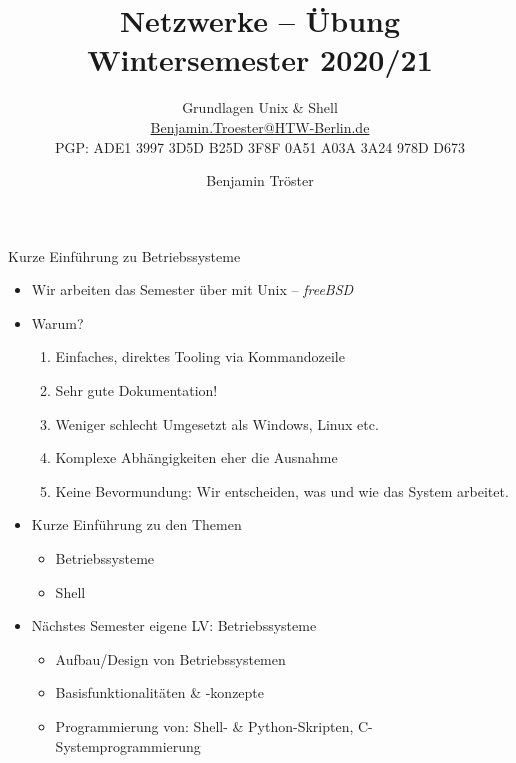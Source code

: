 \documentclass[xcolor=dvipsnames,aspectratio=169]{beamer}
\begin{document}

\title{Netzwerke -- Übung\\Wintersemester 2020/21}
\subtitle{Grundlagen Unix \& Shell\\
\href{mailto:Benjamin.Troester@HTW-Berlin.de}{Benjamin.Troester@HTW-Berlin.de}\\
		PGP: ADE1 3997 3D5D B25D 3F8F 0A51 A03A 3A24 978D D673 }

\author{Benjamin Tröster}

\date{}

\begin{frame}
\titlepage
\end{frame}

\begin{frame}{Kurze Einführung zu Betriebssysteme}
 \vspace*{-0.8cm} 
	\begin{itemize}
		\item Wir arbeiten das Semester über mit Unix -- \emph{freeBSD}
		\item Warum?
		\begin{enumerate}
			\item Einfaches, direktes Tooling via Kommandozeile
			\item Sehr gute Dokumentation!
			\item Weniger schlecht Umgesetzt als Windows, Linux etc.
			\item Komplexe Abhängigkeiten eher die Ausnahme
			\item Keine Bevormundung: Wir entscheiden, was und wie das System arbeitet.
		\end{enumerate}
		\item Kurze Einführung zu den Themen
		\begin{itemize}
			\item Betriebssysteme
			\item Shell
		\end{itemize}
		\item Nächstes Semester eigene LV: Betriebssysteme
		\begin{itemize}
			\item Aufbau/Design von Betriebssystemen
			\item Basisfunktionalitäten \& -konzepte
			\item Programmierung von: Shell- \& Python-Skripten, C-Systemprogrammierung
		\end{itemize}
	\end{itemize}
\end{frame}
\end{document}

